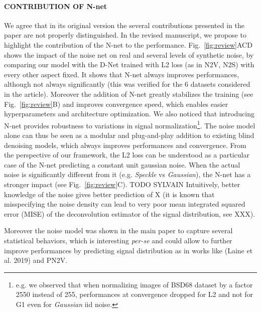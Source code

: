\documentclass{article}
\begin{document}
\paragraph{CONTRIBUTION OF N-net}
We agree that in its original version the several contributions presented in the paper are not properly distinguished.
In the revised manuscript, we propose to highlight the contribution of the N-net to the performance.
Fig.~\ref{fig:review}ACD shows the impact of the noise net on real and several levels of synthetic noise, by comparing our model with the D-Net trained with L2 loss (as in N2V, N2S) with every other aspect fixed.
It shows that N-net always improves performances, although not always significantly (this was verified for the 6 datasets considered in the article). Moreover the addition of N-net greatly stabilizes the training (see Fig.~\ref{fig:review}B) and improves convergence speed, which enables easier hyperparameters and architecture optimization.
We also noticed that introducing N-net provides robustness to variations in signal normalization\footnote{e.g. we observed that when normalizing images of BSD68 dataset by a factor 2550 instead of 255, performances at convergence dropped for L2 and not for G1 even for \textit{Gaussian} iid noise.}.
The noise model alone can thus be seen as a modular and plug-and-play addition to existing blind denoising models, which always improves performances and convergence.
From the perspective of our framework, the L2 loss can be understood as a particular case of the N-net predicting a constant unit gaussian noise. When the actual noise is significantly different from it (e.g. \textit{Speckle} vs \textit{Gaussian}), the N-net has a stronger impact (see Fig.~\ref{fig:review}C).
TODO SYLVAIN  Intuitively, better knowledge of the noise gives better prediction of X (it is known that misspecifying the noise density can lead to very poor mean integrated squared error (MISE) of the deconvolution estimator of the signal distribution, see XXX).

Moreover the noise model was shown in the main paper to capture several statistical behaviors, which is interesting \textit{per-se} and could allow to further improve performances by predicting signal distribution as in works like (Laine et al. 2019) and PN2V.
\end{document}
